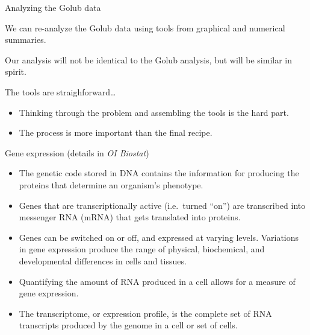 \documentclass[10pt]{beamer}\usepackage[]{graphicx}\usepackage[]{color}
\begin{document}
						\begin{frame}{Analyzing the Golub data}
							\protect\hypertarget{analyzing-the-golub-data}{}
							
							We can re-analyze the Golub data using tools from graphical and
							numerical summaries.
							
							Our analysis will not be identical to the Golub analysis, but will be
							similar in spirit.
							
							The tools are straighforward\ldots   
							
							\begin{itemize}
								\item
								Thinking through the problem and assembling the tools is the hard
								part.
								\item
								The process is more important than the final recipe.
							\end{itemize}
							
						\end{frame}
						
						\begin{frame}{Gene expression (details in \emph{OI Biostat})}
							\protect\hypertarget{gene-expression-details-in-oi-biostat}{}
							
							\small
							
							\begin{itemize}
								\item
								The genetic code stored in DNA contains the information for producing
								the proteins that determine an organism's phenotype.
								\item
								Genes that are transcriptionally active (i.e.~turned ``on'') are
								transcribed into messenger RNA (mRNA) that gets translated into
								proteins.
								\item
								Genes can be switched on or off, and expressed at varying levels.
								Variations in gene expression produce the range of physical,
								biochemical, and developmental differences in cells and tissues.
								\item
								Quantifying the amount of RNA produced in a cell allows for a measure
								of gene expression.
								\item
								The transcriptome, or expression profile, is the complete set of RNA
								transcripts produced by the genome in a cell or set of cells.
							\end{itemize}
							
						\end{frame}
						
\end{document}

